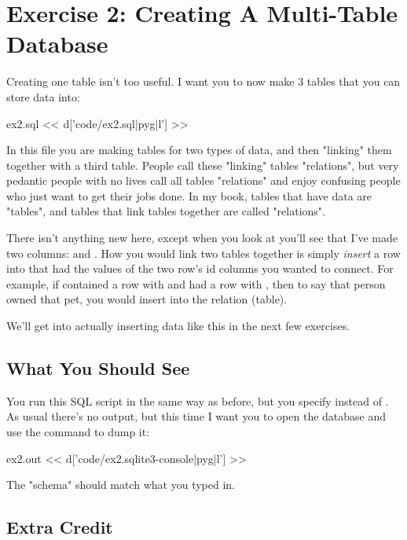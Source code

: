 \chapter{Exercise 2: Creating A Multi-Table Database}

Creating one table isn't too useful.  I want you to now make 3 tables that 
you can store data into:

\begin{code}{ex2.sql}
<< d['code/ex2.sql|pyg|l'] >>
\end{code}

In this file you are making tables for two types of data, and then
"linking" them together with a third table.  People call these 
"linking" tables "relations", but very pedantic people with no
lives call all tables "relations" and enjoy confusing people who
just want to get their jobs done.  In my book, tables that have data
are "tables", and tables that link tables together are called "relations".

There isn't anything new here, except when you look at 
you'll see that I've made two columns:  and .
How you would link two tables together is simply \emph{insert} a row
into  that had the values of the two row's id columns
you wanted to connect.  For example, if  contained a row with
 and  had a row with , then to say
that person owned that pet, you would insert 
into the  relation (table).

We'll get into actually inserting data like this in the next few exercises.

\section{What You Should See}

You run this SQL script in the same way as before, but you specify
 instead of .  As usual there's no output,
but this time I want you to open the database and use the 
 command to dump it:

\begin{code}{ex2.out}
<< d['code/ex2.sqlite3-console|pyg|l'] >>
\end{code}

The "schema" should match what you typed in.

\section{Extra Credit}

